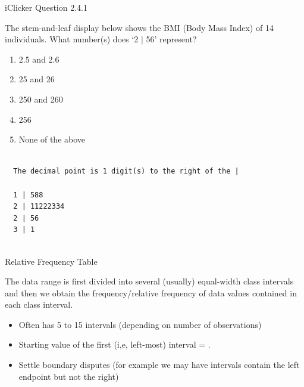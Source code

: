 \documentclass[14pt]{beamer}\usepackage[]{graphicx}\usepackage[]{color}
\begin{document}
\begin{frame}[fragile]{iClicker Question 2.4.1}

The stem-and-leaf display below shows the BMI (Body Mass Index) of  14 individuals. What number(s) does `2 $|$ 56' represent?


\begin{minipage}[ht]{4.5cm}

{\small{
\begin{enumerate}
\item 2.5 and 2.6
\item 25 and 26
\item 250 and 260
\item 256
\item None of the above
\end{enumerate}
}}
\end{minipage} \hfill
\begin{minipage}[ht]{7cm}

{\tiny{
\begin{verbatim}

  The decimal point is 1 digit(s) to the right of the |

  1 | 588
  2 | 11222334
  2 | 56
  3 | 1


\end{verbatim}
}}
\end{minipage}
\end{frame}

\begin{frame}[fragile]{Relative Frequency Table}

The data range is first divided into several (usually) equal-width class intervals and then we obtain the frequency/relative frequency of data  values contained in each class interval.

\begin{itemize}
\item Often has 5 to 15 intervals (depending on number of observations)  
\item Starting value of the first (i,e, left-most) interval = \underline{\phantom{xxxxx}}.
\item Settle boundary disputes (for example we may have intervals contain the left endpoint but not the right)
\end{itemize}
\end{frame}
\end{document}
